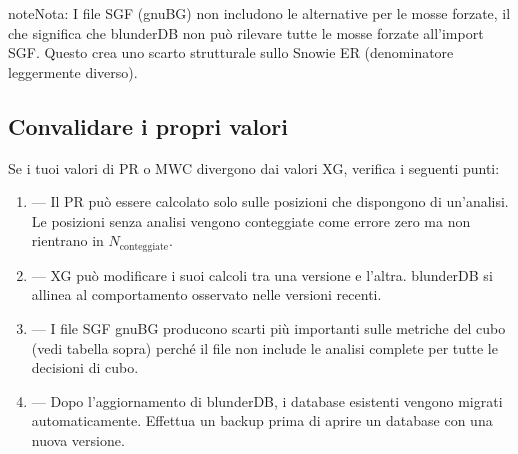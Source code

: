 \documentclass[letterpaper,10pt,italian]{sphinxmanual}
\begin{document}
\begin{sphinxadmonition}{note}{Nota:}
\sphinxAtStartPar
I file SGF (gnuBG) non includono le alternative per le mosse forzate, il che significa che blunderDB non può rilevare tutte le mosse forzate all’import SGF. Questo crea uno scarto strutturale sullo Snowie ER (denominatore leggermente diverso).
\end{sphinxadmonition}


\subsection{Convalidare i propri valori}
\label{\detokenize{stats_parity:valider-vos-propres-chiffres}}
\sphinxAtStartPar
Se i tuoi valori di PR o MWC divergono dai valori XG, verifica i seguenti punti:
\begin{enumerate}
%
\item {} 
\sphinxAtStartPar
{} — Il PR può essere calcolato solo sulle posizioni che dispongono di un’analisi. Le posizioni senza analisi vengono conteggiate come errore zero ma non rientrano in \(N_\text{conteggiate}\).

\item {} 
\sphinxAtStartPar
{} — XG può modificare i suoi calcoli tra una versione e l’altra. blunderDB si allinea al comportamento osservato nelle versioni recenti.

\item {} 
\sphinxAtStartPar
{} — I file SGF gnuBG producono scarti più importanti sulle metriche del cubo (vedi tabella sopra) perché il file non include le analisi complete per tutte le decisioni di cubo.

\item {} 
\sphinxAtStartPar
{} — Dopo l’aggiornamento di blunderDB, i database esistenti vengono migrati automaticamente. Effettua un backup prima di aprire un database con una nuova versione.

\end{enumerate}
\end{document}
